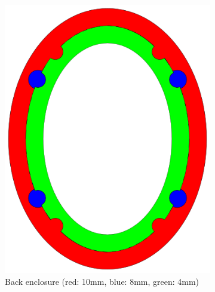 \documentclass{article}
\begin{document}
\begin{figure}[htb]
    \centering
    \begin{subfigure}[b]{0.24\textwidth}
        \includegraphics[width=\textwidth]{images/encasing_back_height_map.png}
        \caption{Back enclosure (red: 10mm, blue: 8mm, green: 4mm)}
        \label{f:enclosure:back}
    \end{subfigure}
    \begin{subfigure}[b]{0.24\textwidth}

\end{subfigure}
\end{figure}
\end{document}
